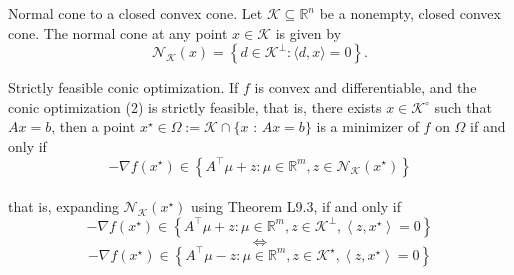 \begin{theorem}[L9.3]{Normal cone to a closed convex cone.}
    Let $\mathcal{K} \subseteq \mathbb{R}^n$ be a nonempty, closed convex cone. The normal cone at any point $x \in \mathcal{K}$ is given by
    \vspace{-4pt}\\
    $$
    \mathcal{N}_{\mathcal{K}}(x)=\left\{d \in \mathcal{K}^{\perp}:\langle d, x\rangle=0\right\} .
    $$
    \vspace{-4pt}
\end{theorem}



\begin{theorem}[L9.4]{Strictly feasible conic optimization.}
    If $f$ is convex and differentiable, and the conic optimization (2) is strictly feasible, that is, there exists $x \in \mathcal{K}^{\circ}$ such that $A x=b$, then a point $x^{\star} \in \Omega:=\mathcal{K} \cap\{x$ : $A x=b\}$ is a minimizer of $f$ on $\Omega$ if and only if
    \vspace{-4pt}\\
    $$
    -\nabla f\left(x^{\star}\right) \in\left\{A^{\top} \mu+z: \mu \in \mathbb{R}^m, z \in \mathcal{N}_{\mathcal{K}}\left(x^{\star}\right)\right\}
    $$
    \vspace{-4pt}\\
    that is, expanding $\mathcal{N}_{\mathcal{K}}\left(x^{\star}\right)$ using Theorem L9.3, if and only if
    \vspace{-4pt}\\
    $$
    -\nabla f\left(x^{\star}\right) \in\left\{A^{\top} \mu+z: \mu \in \mathbb{R}^m, z \in \mathcal{K}^{\perp},\left\langle z, x^{\star}\right\rangle=0\right\}
    $$
    \vspace{-8pt}
    $$
    \Leftrightarrow
    $$
    \vspace{-8pt}
    $$
    -\nabla f\left(x^{\star}\right) \in\left\{A^{\top} \mu-z: \mu \in \mathbb{R}^m, z \in \mathcal{K}^{\star},\left\langle z, x^{\star}\right\rangle=0\right\}
    $$
    \vspace{-4pt}
\end{theorem}

